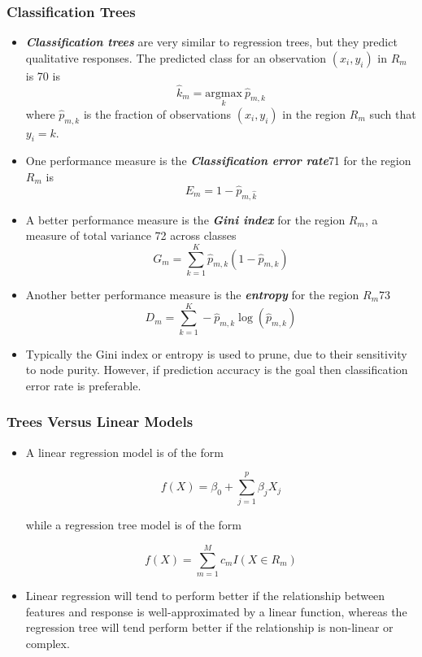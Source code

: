 \documentclass[11pt]{article}
\providecommand{\tightlist}{%
      \setlength{\itemsep}{0pt}\setlength{\parskip}{0pt}}
\begin{document}
    \hypertarget{classification-trees}{%
\subsubsection{Classification Trees}\label{classification-trees}}

    \begin{itemize}
\tightlist
\item
  \textbf{\emph{Classification trees}} are very similar to regression
  trees, but they predict qualitative responses. The predicted class for
  an observation \((x_i, y_i)\) in \(R_m\) is 70 is
  \[ \hat{k}_m = \underset{k}{\text{argmax}}\ \hat{p}_{m,k} \] where
  \(\hat{p}_{m,k}\) is the fraction of observations \((x_i, y_i)\) in
  the region \(R_m\) such that \(y_i = k\).
\item
  One performance measure is the \textbf{\emph{Classification error
  rate}}71 for the region \(R_m\) is
  \[ E_m = 1 - \hat{p}_{m, \hat{k}} \]
\item
  A better performance measure is the \textbf{\emph{Gini index}} for the
  region \(R_m\), a measure of total variance 72 across classes
  \[ G_m = \sum_{k = 1}^K \hat{p}_{m,k}(1 - \hat{p}_{m,k})\]
\item
  Another better performance measure is the \textbf{\emph{entropy}} for
  the region \(R_m\)73
  \[ D_m = \sum_{k = 1}^K - \hat{p}_{m,k}\log(\hat{p}_{m,k}) \]
\item
  Typically the Gini index or entropy is used to prune, due to their
  sensitivity to node purity. However, if prediction accuracy is the
  goal then classification error rate is preferable.
\end{itemize}

    \hypertarget{trees-versus-linear-models}{%
\subsubsection{Trees Versus Linear
Models}\label{trees-versus-linear-models}}

    \begin{itemize}
\item
  A linear regression model is of the form

  \[f(X) = \beta_0 + \sum_{j = 1}^p \beta_j X_j\]

  while a regression tree model is of the form

  \[ f(X) = \sum_{m = 1}^M c_m I(X \in R_m)\]
\item
  Linear regression will tend to perform better if the relationship
  between features and response is well-approximated by a linear
  function, whereas the regression tree will tend perform better if the
  relationship is non-linear or complex.
\end{itemize}
\end{document}
